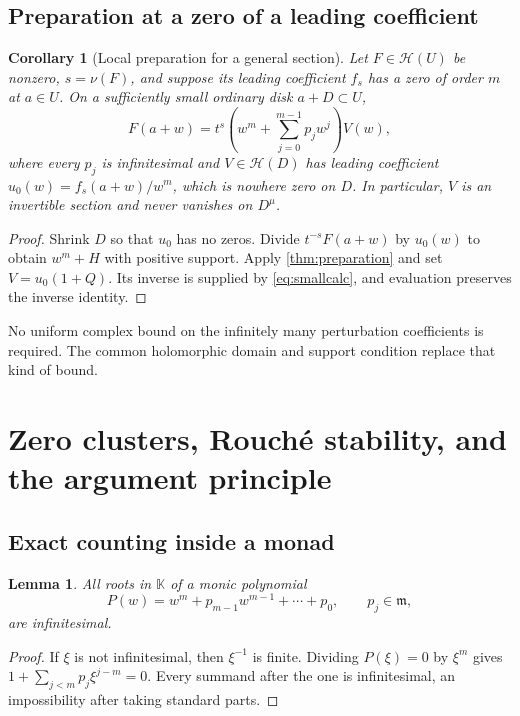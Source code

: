 \documentclass[11pt,oneside]{article}
\numberwithin{equation}{section}
\newtheorem{lemma}[theorem]{Lemma}
\newtheorem{corollary}[theorem]{Corollary}
\theoremstyle{definition}
\theoremstyle{remark}\newtheorem{remark}[theorem]{Remark}
\newcommand{\K}{\mathbb K}
\newcommand{\HH}{\mathscr H}
\newcommand{\m}{\mathfrak m}
\begin{document}
\subsection{Preparation at a zero of a leading coefficient}
\begin{corollary}[Local preparation for a general section]\label{cor:generalprep}
Let $F\in\HH(U)$ be nonzero, $s=\nu(F)$, and suppose its leading
coefficient $f_s$ has a zero of order $m$ at $a\in U$. On a sufficiently
small ordinary disk $a+D\subset U$,
\begin{equation}\label{eq:generalprep}
 F(a+w)=t^s\left(w^m+\sum_{j=0}^{m-1}p_jw^j\right)V(w),
\end{equation}
where every $p_j$ is infinitesimal and $V\in\HH(D)$ has leading
coefficient $u_0(w)=f_s(a+w)/w^m$, which is nowhere zero on $D$.
In particular, $V$ is an invertible section and never vanishes on $D^\mu$.
\end{corollary}
\begin{proof}
Shrink $D$ so that $u_0$ has no zeros. Divide $t^{-s}F(a+w)$ by $u_0(w)$
to obtain $w^m+H$ with positive support. Apply
\cref{thm:preparation} and set $V=u_0(1+Q)$. Its inverse is supplied by
\eqref{eq:smallcalc}, and evaluation preserves the inverse identity.
\end{proof}
No uniform complex bound on the infinitely many perturbation coefficients
is required. The common holomorphic domain and support condition replace
that kind of bound.

\section{Zero clusters, Rouch\'e stability, and the argument principle}
\subsection{Exact counting inside a monad}
\begin{lemma}\label{lem:smallpolyroots}
All roots in $\K$ of a monic polynomial
\[
 P(w)=w^m+p_{m-1}w^{m-1}+\cdots+p_0,
 \qquad p_j\in\m,
\]
are infinitesimal.
\end{lemma}
\begin{proof}
If $\xi$ is not infinitesimal, then $\xi^{-1}$ is finite. Dividing
$P(\xi)=0$ by $\xi^m$ gives
$1+\sum_{j<m}p_j\xi^{j-m}=0$. Every summand after the one is
infinitesimal, an impossibility after taking standard parts.
\end{proof}
\end{document}
